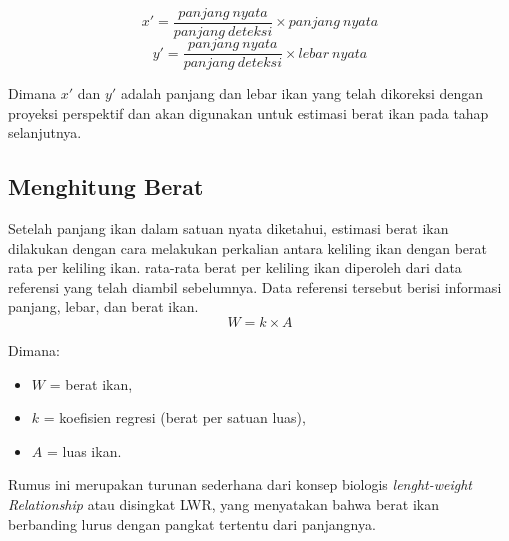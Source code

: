     \begin{equation*}
        x' = \frac{panjang\ nyata}{panjang\ deteksi} \times panjang\ nyata
    \end{equation*}
    \begin{equation*}
        y' = \frac{panjang\ nyata}{panjang\ deteksi} \times lebar\ nyata
    \end{equation*}

    Dimana \(x'\) dan \(y'\) adalah panjang dan lebar ikan yang telah dikoreksi dengan proyeksi perspektif dan akan digunakan untuk estimasi berat ikan pada tahap selanjutnya. 

\subsection{Menghitung Berat}
Setelah panjang ikan dalam satuan nyata diketahui, estimasi berat ikan dilakukan dengan cara melakukan perkalian antara keliling ikan dengan berat rata per keliling ikan.
rata-rata berat per keliling ikan diperoleh dari data referensi yang telah diambil sebelumnya. Data referensi tersebut berisi informasi panjang, lebar, dan berat ikan. 
\begin{equation}
    W = k \times A
\end{equation}

Dimana:
\begin{itemize}
    \item $W$ = berat ikan,
    \item $k$ = koefisien regresi (berat per satuan luas),
    \item $A$ = luas ikan.
\end{itemize}

Rumus ini merupakan turunan sederhana dari konsep biologis \emph{lenght-weight Relationship} atau disingkat LWR, yang menyatakan bahwa berat ikan berbanding lurus dengan pangkat tertentu dari panjangnya. 


